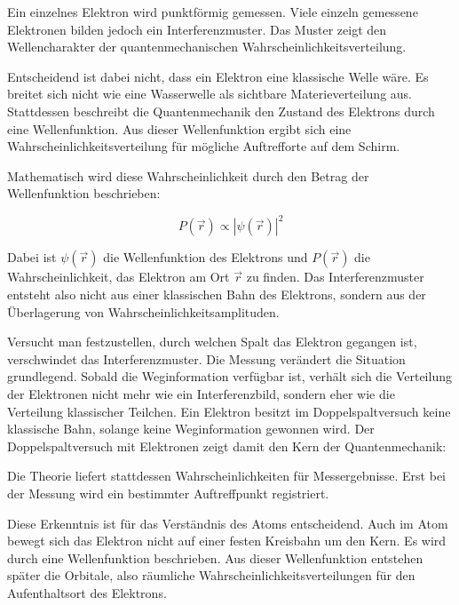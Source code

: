 \begin{PhysicsBox}
	\label{box:elektronen_doppelspalt}
	Ein einzelnes Elektron wird punktförmig gemessen. Viele einzeln gemessene
	Elektronen bilden jedoch ein Interferenzmuster. Das Muster zeigt den
	Wellencharakter der quantenmechanischen Wahrscheinlichkeitsverteilung.
\end{PhysicsBox}

Entscheidend ist dabei nicht, dass ein Elektron eine klassische Welle wäre. Es
breitet sich nicht wie eine Wasserwelle als sichtbare Materieverteilung aus.
Stattdessen beschreibt die Quantenmechanik den Zustand
des Elektrons durch eine Wellenfunktion. Aus dieser
Wellenfunktion ergibt sich eine Wahrscheinlichkeitsverteilung
 für mögliche Auftrefforte auf dem Schirm.

Mathematisch wird diese Wahrscheinlichkeit durch den Betrag der Wellenfunktion
beschrieben:

\begin{equation}
	P(\vec r) \propto |\psi(\vec r)|^2
	\label{eq:wahrscheinlichkeit_wellenfunktion}
\end{equation}

Dabei ist \(\psi(\vec r)\) die Wellenfunktion des
Elektrons und \(P(\vec r)\) die Wahrscheinlichkeit,
das Elektron am Ort \(\vec r\) zu finden. Das Interferenzmuster entsteht also
nicht aus einer klassischen Bahn des Elektrons, sondern aus der Überlagerung
von Wahrscheinlichkeitsamplituden.

Versucht man festzustellen, durch welchen Spalt das Elektron gegangen ist,
verschwindet das Interferenzmuster. Die Messung verändert die
Situation grundlegend. Sobald die Weginformation
verfügbar ist, verhält sich die Verteilung der Elektronen nicht mehr wie ein
Interferenzbild, sondern eher wie die Verteilung klassischer Teilchen.
Ein Elektron besitzt im Doppelspaltversuch keine klassische Bahn, solange keine
Weginformation gewonnen wird.
Der Doppelspaltversuch mit Elektronen zeigt damit den Kern der Quantenmechanik:

Die Theorie liefert stattdessen Wahrscheinlichkeiten für Messergebnisse. Erst
bei der Messung wird ein bestimmter Auftreffpunkt registriert.

Diese Erkenntnis ist für das Verständnis des Atoms entscheidend. Auch im Atom
bewegt sich das Elektron nicht auf einer festen Kreisbahn um den Kern. Es wird
durch eine Wellenfunktion beschrieben. Aus dieser Wellenfunktion entstehen
später die Orbitale, also räumliche
Wahrscheinlichkeitsverteilungen für den Aufenthaltsort des Elektrons.